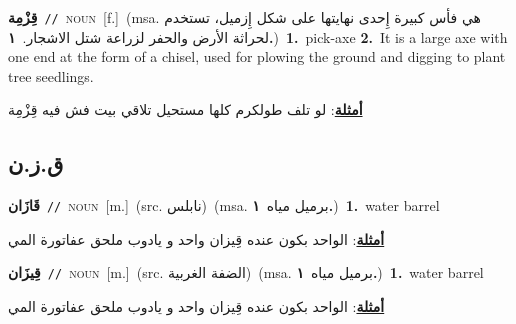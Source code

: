 \documentclass[10pt,a4paper,twoside]{article} %
\begin{document}
\begin{multicols}{2}
{\setlength\topsep{0pt}\textbf{\foreignlanguage{arabic}{قِزْمِة}}\ {\color{gray}\texttt{//}\color{black}}\ \textsc{noun}\ [f.]\ \color{gray}(msa. \foreignlanguage{arabic}{هي فأس كبيرة إِحدى نهايتها على شكل إِزميل، تستخدم لحراثة الأرض والحفر لزراعة شتل الاشجار.}~\foreignlanguage{arabic}{\textbf{١.}})\color{black}\ \textbf{1.}~pick-axe  \textbf{2.}~It is a large axe with one end at the form of a chisel, used for plowing the ground and digging to plant tree seedlings.\  \begin{flushright}\color{gray}\foreignlanguage{arabic}{\textbf{\underline{\foreignlanguage{arabic}{أمثلة}}}: لو تلف طولكرم كلها مستحيل تلاقي بيت فش فيه قِزْمِة}\end{flushright}\color{black}} \vspace{2mm}

\vspace{-3mm}
\subsection*{\color{blue}\foreignlanguage{arabic}{ق.ز.ن}\color{blue}{}} 

{\setlength\topsep{0pt}\textbf{\foreignlanguage{arabic}{قَازَان}}\ {\color{gray}\texttt{//}\color{black}}\ \textsc{noun}\ [m.]\ (src. \color{gray}\foreignlanguage{arabic}{نابلس}\color{black})\ \color{gray}(msa. \foreignlanguage{arabic}{برميل مياه}~\foreignlanguage{arabic}{\textbf{١.}})\color{black}\ \textbf{1.}~water barrel\  \begin{flushright}\color{gray}\foreignlanguage{arabic}{\textbf{\underline{\foreignlanguage{arabic}{أمثلة}}}: الواحد بكون عنده قِيزان واحد و يادوب ملحق عفاتورة المي}\end{flushright}\color{black}} \vspace{2mm}

{\setlength\topsep{0pt}\textbf{\foreignlanguage{arabic}{قِيزَان}}\ {\color{gray}\texttt{//}\color{black}}\ \textsc{noun}\ [m.]\ (src. \color{gray}\foreignlanguage{arabic}{الضفة الغربية}\color{black})\ \color{gray}(msa. \foreignlanguage{arabic}{برميل مياه}~\foreignlanguage{arabic}{\textbf{١.}})\color{black}\ \textbf{1.}~water barrel\  \begin{flushright}\color{gray}\foreignlanguage{arabic}{\textbf{\underline{\foreignlanguage{arabic}{أمثلة}}}: الواحد بكون عنده قِيزان واحد و يادوب ملحق عفاتورة المي}\end{flushright}\color{black}} \vspace{2mm}


\end{multicols}
\end{document}
